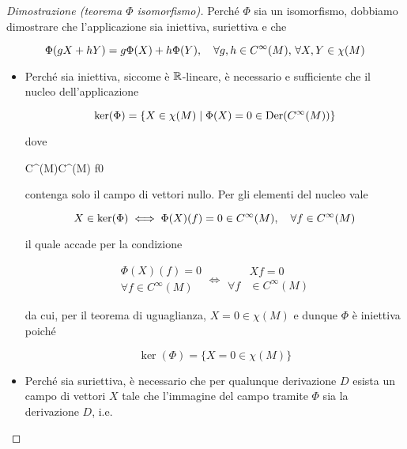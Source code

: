 \begin{proof}[Dimostrazione (teorema $ \Phi $ isomorfismo)]
	Perché $ \Phi $ sia un isomorfismo, dobbiamo dimostrare che l'applicazione sia iniettiva, suriettiva e che
	
	\begin{equation}
		\Phi(g X + h Y) = g \Phi(X) + h \Phi(Y) \qcomma \forall g,h \in C^{\infty}(M), \, \forall X,Y \in \chi(M)
	\end{equation}

\begin{itemize}
	\item Perché sia iniettiva, siccome è $ \mathbb{R} $-lineare, è necessario e sufficiente che il nucleo dell'applicazione
	
	\begin{equation}
		\ker(\Phi) = \{ X \in \chi(M) \mid \Phi(X) = 0 \in \operatorname{Der}(C^{\infty}(M)) \}
	\end{equation}

	dove
	
		{C^{\infty}(M)}{C^{\infty}(M)}
		{f}{0}

	contenga solo il campo di vettori nullo. Per gli elementi del nucleo vale
	
	\begin{equation}
		X \in \ker(\Phi) \iff \Phi(X)(f) = 0 \in C^{\infty}(M) \qcomma \forall f \in C^{\infty}(M)
	\end{equation}

	il quale accade per la condizione
	
	\begin{equation}
		\begin{aligned}
			\Phi(X)(f) = 0 \\
			\forall f \in C^{\infty}(M)
		\end{aligned} %
		\iff %
		\begin{aligned}
			& X f = 0 \\
			\forall f &\in C^{\infty}(M)
		\end{aligned}
	\end{equation}

	da cui, per il teorema di uguaglianza, $ X = 0 \in \chi(M) $ e dunque $ \Phi $ è iniettiva poiché
	
	\begin{equation}
		\ker(\Phi) = \{ X = 0 \in \chi(M) \}
	\end{equation}

	
	\item Perché sia suriettiva, è necessario che per qualunque derivazione $ D $ esista un campo di vettori $ X $ tale che l'immagine del campo tramite $ \Phi $ sia la derivazione $ D $, i.e.
	

\end{itemize}
\end{proof}
